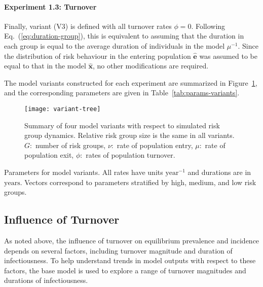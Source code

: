 \paragraph{Experiment 1.3: Turnover}\label{p:exp-1-turnover}
Finally, variant (V3) is defined with all turnover rates $\phi = 0$.
Following Eq.~(\ref{eq:duration-group}),
this is equivalent to assuming that the duration in each group is equal to
the average duration of individuals in the model $\mu^{-1}$.
Since the distribution of risk behaviour in the entering population $\bm{\hat{e}}$
was assumed to be equal to that in the model $\bm{\hat{x}}$,
no other modifications are required.
\par
The model variants constructed for each experiment
are summarized in Figure~\ref{fig:variant-tree},
and the corresponding parameters are given in Table~\ref{tab:params-variants}.
\begin{figure}
  \centering
  \texttt{[image: variant-tree]}
  \caption{Summary of four model variants
    with respect to simulated risk group dynamics.
    Relative risk group size is the same in all variants.
    $G$:~number of risk groups,
    $\nu$:~rate of population entry,
    $\mu$:~rate of population exit,
    $\phi$:~rates of population turnover.}
  \label{fig:variant-tree}
\end{figure}
\begin{table}
  \centering
  \caption{Parameters for model variants.
    All rates have units $\mathrm{year}^{-1}$ and durations are in $\mathrm{years}$.
    Vectors correspond to parameters stratified by high, medium, and low risk groups.}
  \label{tab:params-variants}
  
\end{table}
\subsection{Influence of Turnover}\label{ss:exp-turnover}
As noted above, the influence of turnover on equilibrium prevalence and incidence
depends on several factors, including
turnover magnitude and duration of infectiousness.
To help understand trends in model outputs with respect to these factors,
the base model is used to explore
a range of turnover magnitudes and durations of infectiousness.

